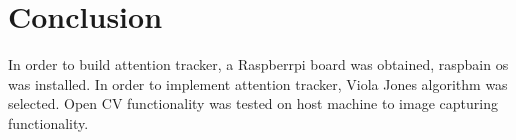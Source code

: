 \section{Conclusion}
In order to build attention tracker, a Raspberrpi board was obtained, raspbain os was installed. In order to implement attention tracker, Viola Jones algorithm was selected. Open CV functionality was tested on host machine to image capturing functionality. 
